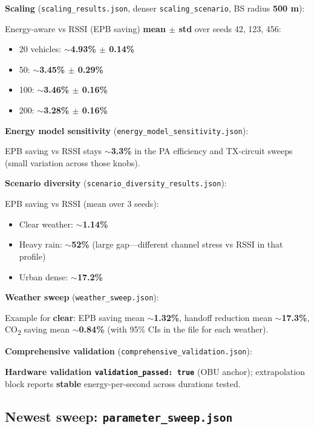 \documentclass[11pt,a4paper]{article}
\begin{document}
\begin{assistmsg}
\textbf{Scaling} (\texttt{scaling\_results.json}, denser \texttt{scaling\_scenario}, BS radius \textbf{500 m}):

Energy-aware vs RSSI (EPB saving) \textbf{mean $\pm$ std} over seeds 42, 123, 456:

\begin{itemize}
\item 20 vehicles: \textbf{$\sim$4.93\% $\pm$ 0.14\%}
\item 50: \textbf{$\sim$3.45\% $\pm$ 0.29\%}
\item 100: \textbf{$\sim$3.46\% $\pm$ 0.16\%}
\item 200: \textbf{$\sim$3.28\% $\pm$ 0.16\%}
\end{itemize}

\textbf{Energy model sensitivity} (\texttt{energy\_model\_sensitivity.json}):

EPB saving vs RSSI stays \textbf{$\sim$3.3\%} in the PA efficiency and TX-circuit sweeps (small variation across those knobs).

\textbf{Scenario diversity} (\texttt{scenario\_diversity\_results.json}):

EPB saving vs RSSI (mean over 3 seeds):

\begin{itemize}
\item Clear weather: \textbf{$\sim$1.14\%}
\item Heavy rain: \textbf{$\sim$52\%} (large gap---different channel stress vs RSSI in that profile)
\item Urban dense: \textbf{$\sim$17.2\%}
\end{itemize}

\textbf{Weather sweep} (\texttt{weather\_sweep.json}):

Example for \textbf{clear}: EPB saving mean \textbf{$\sim$1.32\%}, handoff reduction mean \textbf{$\sim$17.3\%}, CO\textsubscript{2} saving mean \textbf{$\sim$0.84\%} (with 95\% CIs in the file for each weather).

\textbf{Comprehensive validation} (\texttt{comprehensive\_validation.json}):

\textbf{Hardware validation \texttt{validation\_passed: true}} (OBU anchor); extrapolation block reports \textbf{stable} energy-per-second across durations tested.

\subsection*{Newest sweep: \texttt{parameter\_sweep.json}}


\end{assistmsg}
\end{document}
